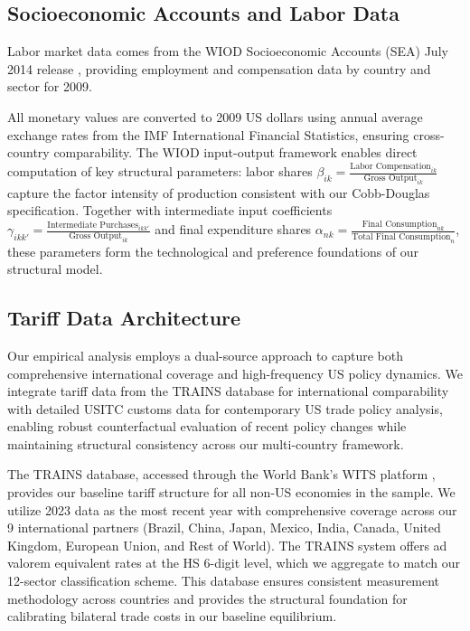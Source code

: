 



\subsection{Socioeconomic Accounts and Labor Data}

Labor market data comes from the WIOD Socioeconomic Accounts (SEA) July 2014 release \citep{timmer2015illustrated}, providing employment and compensation data by country and sector for 2009. 

All monetary values are converted to 2009 US dollars using annual average exchange rates from the IMF International Financial Statistics, ensuring cross-country comparability. The WIOD input-output framework enables direct computation of key structural parameters: labor shares $\beta_{ik} = \frac{\text{Labor Compensation}_{ik}}{\text{Gross Output}_{ik}}$ capture the factor intensity of production consistent with our Cobb-Douglas specification. Together with intermediate input coefficients $\gamma_{ikk'} = \frac{\text{Intermediate Purchases}_{ikk'}}{\text{Gross Output}_{ik}}$ and final expenditure shares $\alpha_{nk} = \frac{\text{Final Consumption}_{nk}}{\text{Total Final Consumption}_{n}}$, these parameters form the technological and preference foundations of our structural model.

\subsection{Tariff Data Architecture}

Our empirical analysis employs a dual-source approach to capture both comprehensive international coverage and high-frequency US policy dynamics. We integrate tariff data from the TRAINS database for international comparability with detailed USITC customs data for contemporary US trade policy analysis, enabling robust counterfactual evaluation of recent policy changes while maintaining structural consistency across our multi-country framework.

The TRAINS database, accessed through the World Bank's WITS platform \citep{WITS2025}, provides our baseline tariff structure for all non-US economies in the sample. We utilize 2023 data as the most recent year with comprehensive coverage across our 9 international partners (Brazil, China, Japan, Mexico, India, Canada, United Kingdom, European Union, and Rest of World). The TRAINS system offers ad valorem equivalent rates at the HS 6-digit level, which we aggregate to match our 12-sector classification scheme. This database ensures consistent measurement methodology across countries and provides the structural foundation for calibrating bilateral trade costs in our baseline equilibrium.


